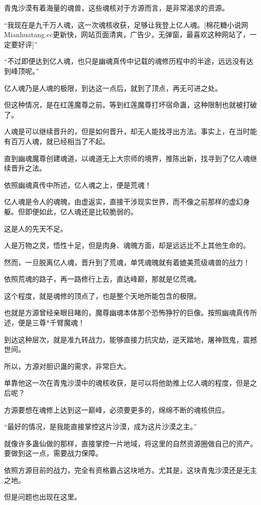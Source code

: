 \begin{this_body}
青鬼沙漠有着海量的魂兽，这些魂核对于方源而言，是非常渴求的资源。

“我现在是九千万人魂，这一次魂核收获，足够让我登上亿人魂。[棉花糖小说网Mianhuatang.cc更新快，网站页面清爽，广告少，无弹窗，最喜欢这种网站了，一定要好评]”

“不过即便达到亿人魂，也只是幽魂真传中记载的魂修历程中的半途，远远没有达到峰顶呢。”

亿人魂乃是人魂的极限，到达这一点后，就到了顶点，再无可进之处。

但这种情况，是在红莲魔尊之前。等到红莲魔尊打坏宿命蛊，这种限制也就被打破了。

人魂是可以继续晋升的，但是如何晋升，却无人能找寻出方法。事实上，在当时能有百万人魂，就已经相当了不起。

直到幽魂魔尊创建魂道，以魂道无上大宗师的境界，推陈出新，找寻到了亿人魂继续晋升之法。

依照幽魂真传中所述，亿人魂之上，便是荒魂！

亿人魂是令人的魂魄，由虚返实，直接干涉现实世界，而不像之前那样的虚幻身躯。但即便如此，亿人魂还是比较脆弱的。

这是人的先天不足。

人是万物之灵，悟性十足，但是肉身、魂魄方面，却是远远比不上其他生命的。

然而，一旦脱离亿人魂，晋升到了荒魂，单凭魂魄就有着媲美荒级魂兽的战力！

依照荒魂的路子，再一路修行上去，直达峰巅，那就是亿荒魂。

这个程度，就是魂修的顶点了，也是整个天地所能包含的极限。

也就是方源曾经亲眼目睹的，魔尊幽魂本体那个恐怖狰狞的巨像。按照幽魂真传所述，便是三尊*千臂魔魂！

到达这种层次，就是准九转战力，能够直接力抗灾劫，逆天踏地，屠神戮鬼，震撼世间。

所以，方源对胆识蛊的需求，非常巨大。

单靠他这一次在青鬼沙漠中的魂核收获，是可以将他助推上亿人魂的程度，但是之后呢？

方源要想在魂修上达到这一巅峰，必须要更多的，绵绵不断的魂核供应。

“最好的情况，是我能直接掌控这片沙漠，成为这片沙漠之主。”

就像许多蛊仙做的那样，直接掌控一片地域，将这里的自然资源圈做自己的资产。要做到这一点，需要战力保障。

依照方源目前的战力，完全有资格霸占这块地方。尤其是，这块青鬼沙漠还是无主之地。

但是问题也出现在这里。


\end{this_body}
